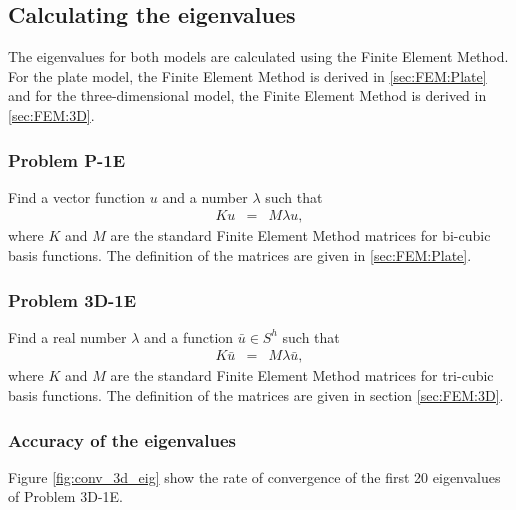 \documentclass[../../main.tex]{subfiles}
\begin{document}
\begin{figure}[h!]
{{\begin{minipage}[b]{0.8\linewidth}
				
			\end{minipage}
		}
	}
\end{figure}
\FloatBarrier

\subsection{Calculating the eigenvalues}
The eigenvalues for both models are calculated using the Finite Element Method. For the plate model, the Finite Element Method is derived in \ref{sec:FEM:Plate} and for the three-dimensional model, the Finite Element Method is derived in \ref{sec:FEM:3D}.

\subsubsection{Problem P-1E}
Find a vector function $u$ and a number $\lambda$ such that
\begin{eqnarray}
	K{u} & = & M\lambda{u}, 
\end{eqnarray} where $K$ and $M$ are the standard Finite Element Method matrices for bi-cubic basis functions. The definition of the matrices are given in \ref{sec:FEM:Plate}.

\subsubsection{Problem 3D-1E}
Find a real number $\lambda$ and a function $\bar{u} \in S^h$ such that
\begin{eqnarray}
	K\bar{u} & = & M\lambda{\bar{u}},
\end{eqnarray} where $K$ and $M$ are the standard Finite Element Method matrices for tri-cubic basis functions. The definition of the matrices are given in section \ref{sec:FEM:3D}.

\subsubsection{Accuracy of the eigenvalues}
Figure \ref{fig:conv_3d_eig} show the rate of convergence of the first 20 eigenvalues of Problem 3D-1E. 
\end{document}
